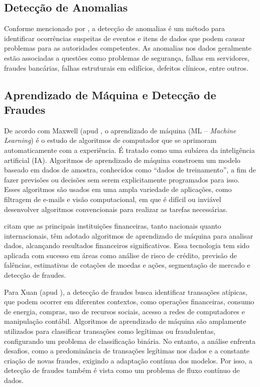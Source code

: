 \documentclass[12pt,a4paper]{article}
\begin{document}
\subsection{Detecção de Anomalias}

Conforme mencionado por \cite{gupta2020}, a detecção de anomalias é um método para identificar ocorrências suspeitas de eventos e itens de dados que podem causar problemas para as autoridades competentes. As anomalias nos dados geralmente estão associadas a questões como problemas de segurança, falhas em servidores, fraudes bancárias, falhas estruturais em edifícios, defeitos clínicos, entre outros.

\subsection{Aprendizado de Máquina e Detecção de Fraudes}

De acordo com Maxwell (apud \cite{martins2022}, o aprendizado de máquina (ML – \textit{Machine Learning}) é o estudo de algoritmos de computador que se aprimoram automaticamente com a experiência. É tratado como uma subárea da inteligência artificial (IA). Algoritmos de aprendizado de máquina constroem um modelo baseado em dados de amostra, conhecidos como “dados de treinamento”, a fim de fazer previsões ou decisões sem serem explicitamente programados para isso. Esses algoritmos são usados em uma ampla variedade de aplicações, como filtragem de e-mails e visão computacional, em que é difícil ou inviável desenvolver algoritmos convencionais para realizar as tarefas necessárias.

\cite{martins2022} citam que as principais instituições financeiras, tanto nacionais quanto internacionais, têm adotado algoritmos de aprendizado de máquina para analisar dados, alcançando resultados financeiros significativos. Essa tecnologia tem sido aplicada com sucesso em áreas como análise de risco de crédito, previsão de falências, estimativas de cotações de moedas e ações, segmentação de mercado e detecção de fraudes.

Para Xuan (apud \cite{martins2022}), a detecção de fraudes busca identificar transações atípicas, que podem ocorrer em diferentes contextos, como operações financeiras, consumo de energia, compras, uso de recursos sociais, acesso a redes de computadores e manipulação contábil. Algoritmos de aprendizado de máquina são amplamente utilizados para classificar transações como legítimas ou fraudulentas, configurando um problema de classificação binária. No entanto, a análise enfrenta desafios, como a predominância de transações legítimas nos dados e a constante criação de novas fraudes, exigindo a adaptação contínua dos modelos. Por isso, a detecção de fraudes também é vista como um problema de fluxo contínuo de dados.
\end{document}
